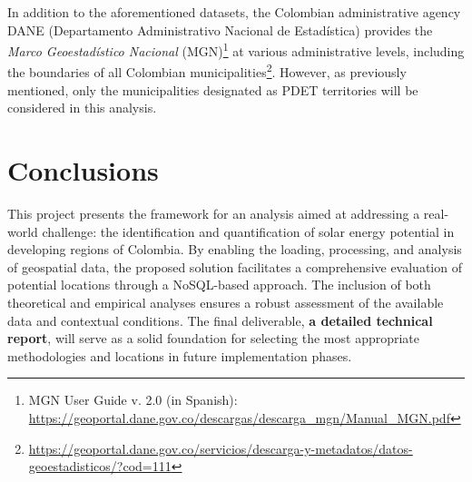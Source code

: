 \documentclass[11pt]{article}
\begin{document}
In addition to the aforementioned datasets, the Colombian administrative agency DANE (Departamento Administrativo Nacional de Estadística) provides the \textit{Marco Geoestadístico Nacional} (MGN)\footnote{MGN User Guide v. 2.0 (in Spanish): \url{https://geoportal.dane.gov.co/descargas/descarga_mgn/Manual_MGN.pdf}} at various administrative levels, including the boundaries of all Colombian municipalities\footnote{\url{https://geoportal.dane.gov.co/servicios/descarga-y-metadatos/datos-geoestadisticos/?cod=111}}. However, as previously mentioned, only the municipalities designated as PDET territories will be considered in this analysis.

\section{Conclusions}
This project presents the framework for an analysis aimed at addressing a real-world challenge: the identification and quantification of solar energy potential in developing regions of Colombia. By enabling the loading, processing, and analysis of geospatial data, the proposed solution facilitates a comprehensive evaluation of potential locations through a NoSQL-based approach. The inclusion of both theoretical and empirical analyses ensures a robust assessment of the available data and contextual conditions. The final deliverable, \textbf{a detailed technical report}, will serve as a solid foundation for selecting the most appropriate methodologies and locations in future implementation phases.

\end{document}
